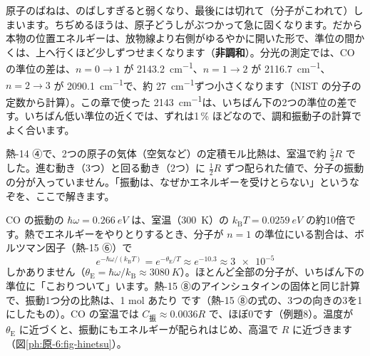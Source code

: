 \begin{motto}[5]
原子のばねは、のばしすぎると弱くなり、最後には切れて（分子がこわれて）しまいます。ちぢめるほうは、原子どうしがぶつかって急に固くなります。だから本物の位置エネルギーは、放物線より右側がゆるやかに開いた形で、準位の間かくは、上へ行くほど少しずつせまくなります（\textbf{非調和}）。分光の測定では、CO の準位の差は、$n=0\to1$ が \qty{2143.2}{cm^{-1}}、$n=1\to2$ が \qty{2116.7}{cm^{-1}}、$n=2\to3$ が \qty{2090.1}{cm^{-1}}で、約 \qty{27}{cm^{-1}}ずつ小さくなります（NIST の分子の定数から計算）。この章で使った \qty{2143}{cm^{-1}}は、いちばん下の2つの準位の差です。いちばん低い準位の近くでは、ずれは1\,\% ほどなので、調和振動子の計算でよく合います。
\end{motto}

\label{ph:原-6:sec10}
熱-14 ④で、2つの原子の気体（空気など）の定積モル比熱は、室温で約 $\tfrac52R$ でした。進む動き（3つ）と回る動き（2つ）に $\tfrac12R$ ずつ配られた値で、分子の振動の分が入っていません。「振動は、なぜかエネルギーを受けとらない」というなぞを、ここで解きます。

\noindent CO の振動の $\hbar\omega=\qty{0.266}{eV}$ は、室温（\qty{300}{K}）の $k_{\mathrm B}T=\qty{0.0259}{eV}$ の約10倍です。熱でエネルギーをやりとりするとき、分子が $n=1$ の準位にいる割合は、ボルツマン因子（熱-15 ⑥）で
\[e^{-\hbar\omega/(k_{\mathrm B}T)}=e^{-\theta_{\mathrm E}/T}\approx e^{-10.3}\approx\num{3e-5}\]
しかありません（$\theta_{\mathrm E}=\hbar\omega/k_{\mathrm B}\approx\qty{3080}{K}$）。ほとんど全部の分子が、いちばん下の準位に「こおりついて」います。熱-15 ⑧のアインシュタインの固体と同じ計算で、振動1つ分の比熱は、1 mol あたり
です（熱-15 ⑧の式の、3つの向きの3を1にしたもの）。CO の室温では $C_{\text{振}}\approx0.0036R$ で、ほぼ0です（例題8）。温度が $\theta_{\mathrm E}$ に近づくと、振動にもエネルギーが配られはじめ、高温で $R$ に近づきます（図\ref{ph:原-6:fig-hinetsu}）。

\begin{bkfigure}
\label{ph:原-6:fig-hinetsu}
\end{bkfigure}

